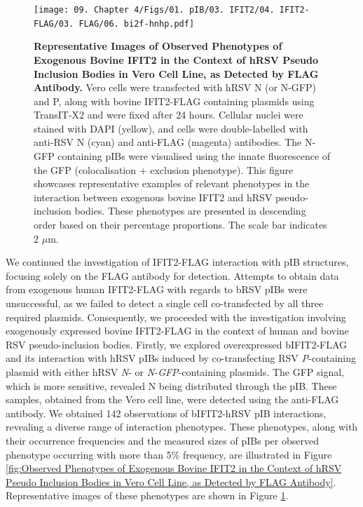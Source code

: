 \begin{figure}
    \centering
    \texttt{[image: 09. Chapter 4/Figs/01. pIB/03. IFIT2/04. IFIT2-FLAG/03. FLAG/06. bi2f-hnhp.pdf]}
    \caption[Representative Images of Observed Phenotypes of Exogenous Bovine IFIT2 in the Context of hRSV Pseudo Inclusion Bodies in Vero Cell Line, as Detected by FLAG Antibody.]{\textbf{Representative Images of Observed Phenotypes of Exogenous Bovine IFIT2 in the Context of hRSV Pseudo Inclusion Bodies in Vero Cell Line, as Detected by FLAG Antibody.} Vero cells were transfected with hRSV N (or N-GFP) and P, along with bovine IFIT2-FLAG containing plasmids using TransIT-X2 and were fixed after 24 hours. Cellular nuclei were stained with DAPI (yellow), and cells were double-labelled with anti-RSV N (cyan) and anti-FLAG (magenta) antibodies. The N-GFP containing pIBs were visualised using the innate fluorescence of the GFP (colocalisation + exclusion phenotype). This figure showcases representative examples of relevant phenotypes in the interaction between exogenous bovine IFIT2 and hRSV pseudo-inclusion bodies. These phenotypes are presented in descending order based on their percentage proportions. The scale bar indicates 2 \(\mu \mbox{m}\).}
    \label{fig:Representative Images of Observed Phenotypes of Exogenous Bovine IFIT2 in the Context of hRSV Pseudo Inclusion Bodies in Vero Cell Line, as Detected by FLAG Antibody}
\end{figure}

We continued the investigation of IFIT2-FLAG interaction with pIB structures, focusing solely on the FLAG antibody for detection. Attempts to obtain data from exogenous human IFIT2-FLAG with regards to bRSV pIBs were unsuccessful, as we failed to detect a single cell co-transfected by all three required plasmids. Consequently, we proceeded with the investigation involving exogenously expressed bovine IFIT2-FLAG in the context of human and bovine RSV pseudo-inclusion bodies. Firstly, we explored overexpressed bIFIT2-FLAG and its interaction with hRSV pIBs induced by co-transfecting RSV \textit{P}-containing plasmid with either hRSV \textit{N}- or \textit{N-GFP}-containing plasmids. The GFP signal, which is more sensitive, revealed N being distributed through the pIB. These samples, obtained from the Vero cell line, were detected using the anti-FLAG antibody. We obtained 142 observations of bIFIT2-hRSV pIB interactions, revealing a diverse range of interaction phenotypes. These phenotypes, along with their occurrence frequencies and the measured sizes of pIBs per observed phenotype occurring with more than 5\% frequency, are illustrated in Figure \ref{fig:Observed Phenotypes of Exogenous Bovine IFIT2 in the Context of hRSV Pseudo Inclusion Bodies in Vero Cell Line, as Detected by FLAG Antibody}. Representative images of these phenotypes are shown in Figure \ref{fig:Representative Images of Observed Phenotypes of Exogenous Bovine IFIT2 in the Context of hRSV Pseudo Inclusion Bodies in Vero Cell Line, as Detected by FLAG Antibody}.

